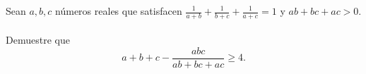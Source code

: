 Sean $a,b,c$ números reales que satisfacen $\frac{1}{a+b}+\frac{1}{b+c}+\frac{1}{a+c} =1$ y $ab+bc+ac >0$. \\\\
Demuestre que
\[ a+b+c - \frac{abc}{ab+bc+ac} \ge 4 .\]
